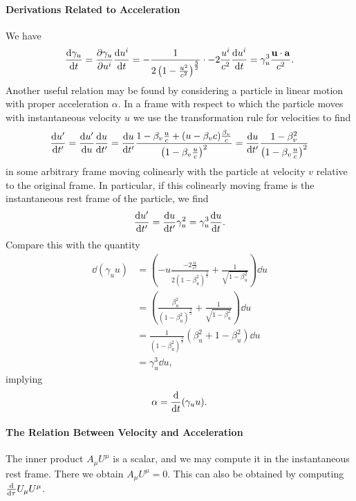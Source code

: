 \paragraph{Derivations Related to Acceleration}
We have
\begin{align*}
	\dv{\gamma_{u}}{t} = \pdv{\gamma_{u}}{u^{i}}\dv{u^{i}}{t} = -\frac{1}{2\left(1 - \frac{u^{2}}{c^{2}}\right)^{\frac{3}{2}}}\cdot -2\frac{u^{i}}{c^{2}}\dv{u^{i}}{t} = \gamma_{u}^{3}\frac{\vb{u}\cdot\vb{a}}{c^{2}}.
\end{align*}
Another useful relation may be found by considering a particle in linear motion with proper acceleration $\alpha$. In a frame with respect to which the particle moves with instantaneous velocity $u$ we use the transformation rule for velocities to find
\begin{align*}
	\dv{u^{\prime}}{t^{\prime}} = \dv{u^{\prime}}{u}\dv{u}{t^{\prime}} = \dv{u}{t^{\prime}}\frac{1 - \beta_{v}\frac{u}{c} + (u - \beta_{v}c)\frac{\beta_{v}}{c}}{\left(1 - \beta_{v}\frac{u}{c}\right)^{2}} = \dv{u}{t^{\prime}}\frac{1 - \beta_{v}^{2}}{\left(1 - \beta_{v}\frac{u}{c}\right)^{2}}
\end{align*}
in some arbitrary frame moving colinearly with the particle at velocity $v$ relative to the original frame. In particular, if this colinearly moving frame is the instantaneous rest frame of the particle, we find
\begin{align*}
	\dv{u^{\prime}}{t^{\prime}} = \dv{u}{t^{\prime}}\gamma_{u}^{2} = \gamma_{u}^{3}\dv{u}{t}.
\end{align*}
Compare this with the quantity
\begin{align*}
	\dd(\gamma_{u}u) &= \left(-u\frac{-2\frac{u}{c^{2}}}{2(1 - \beta_{u}^{2})^{\frac{3}{2}}} + \frac{1}{\sqrt{1 - \beta_{u}^{2}}}\right)\dd{u} \\
	                 &= \left(\frac{\beta_{u}^{2}}{(1 - \beta_{u}^{2})^{\frac{3}{2}}} + \frac{1}{\sqrt{1 - \beta_{u}^{2}}}\right)\dd{u} \\
	                 &= \frac{1}{(1 - \beta_{u}^{2})^{\frac{3}{2}}}\left(\beta_{u}^{2} + 1 - \beta_{u}^{2}\right)\dd{u} \\
	                 &= \gamma_{u}^{3}\dd{u},
\end{align*}
implying
\begin{align*}
	\alpha = \dv{t}(\gamma_{u}u).
\end{align*}

\paragraph{The Relation Between Velocity and Acceleration}
The inner product $A_{\mu}U^{\mu}$ is a scalar, and we may compute it in the instantaneous rest frame. There we obtain $A_{\mu}U^{\mu} = 0$. This can also be obtained by computing $\dv{\tau}U_{\mu}U^{\mu}$.